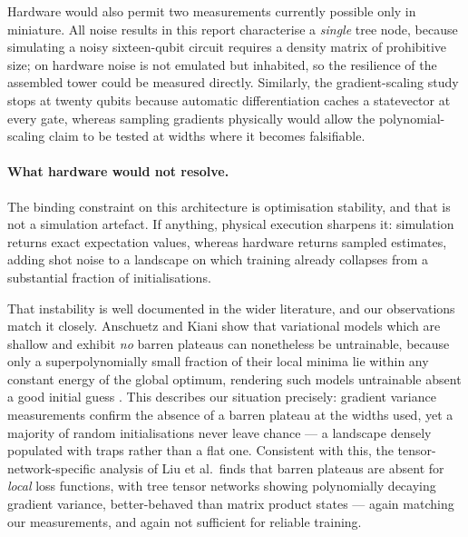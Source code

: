 \documentclass[12pt, a4paper, oneside]{report}
\begin{document}
Hardware would also permit two measurements currently possible only in
miniature. All noise results in this report characterise a \emph{single} tree
node, because simulating a noisy sixteen-qubit circuit requires a density matrix
of prohibitive size; on hardware noise is not emulated but inhabited, so the
resilience of the assembled tower could be measured directly. Similarly, the
gradient-scaling study stops at twenty qubits because automatic differentiation
caches a statevector at every gate, whereas sampling gradients physically would
allow the polynomial-scaling claim to be tested at widths where it becomes
falsifiable.

\paragraph{What hardware would not resolve.} The binding constraint on this
architecture is optimisation stability, and that is not a simulation artefact.
If anything, physical execution sharpens it: simulation returns exact
expectation values, whereas hardware returns sampled estimates, adding shot
noise to a landscape on which training already collapses from a substantial
fraction of initialisations.

That instability is well documented in the wider literature, and our
observations match it closely. Anschuetz and Kiani show that variational models
which are shallow and exhibit \emph{no} barren plateaus can nonetheless be
untrainable, because only a superpolynomially small fraction of their local
minima lie within any constant energy of the global optimum, rendering such
models untrainable absent a good initial guess \cite{anschuetz2022traps}. This
describes our situation precisely: gradient variance measurements confirm the
absence of a barren plateau at the widths used, yet a majority of random
initialisations never leave chance --- a landscape densely populated with traps
rather than a flat one. Consistent with this, the tensor-network-specific
analysis of Liu et al.\ finds that barren plateaus are absent for
\emph{local} loss functions, with tree tensor networks showing polynomially
decaying gradient variance, better-behaved than matrix product states
\cite{liu2022tnbp} --- again matching our measurements, and again not sufficient
for reliable training.
\end{document}
